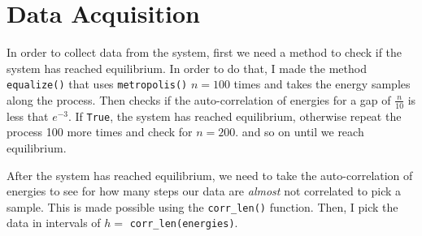 \documentclass[12pt, a4paper]{article}
\begin{document}
	\section{Data Acquisition}
	In order to collect data from the system, first we need a method to check if the system has reached equilibrium. In order to do that, I made the method \texttt{equalize()} that uses 
	\texttt{metropolis()} $n = 100$ times and takes the energy samples along the process. Then checks if the auto-correlation of energies for a gap of $\frac{n}{10}$ is less that $e^{-3}$.
	If \texttt{True}, the system has reached equilibrium, otherwise repeat the process 100 more
	times and check for $n = 200$. and so on until we reach equilibrium.
	
	After the system has reached equilibrium, we need to take the auto-correlation of energies
	to see for how many steps our data are \emph{almost} not correlated to pick a sample.
	This is made possible using the \texttt{corr\_len()} function.
	Then, I pick the data in intervals of $h =$ \texttt{corr\_len(energies)}.
	
\end{document}

